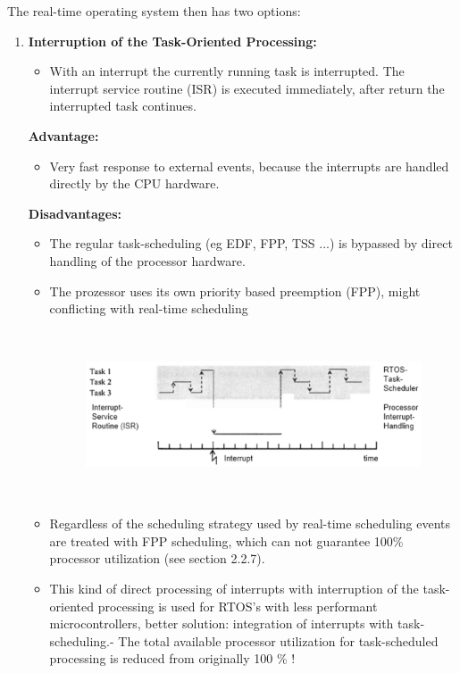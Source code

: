 The real-time operating system then has two options:
\newpage
\begin{enumerate}
\item {\rot\bf Interruption of the Task-Oriented Processing: }

\begin{itemize}
	\item With an interrupt the currently running task is interrupted. The interrupt service routine (ISR) is executed immediately, after return the interrupted task continues.
\end{itemize}

\textbf{Advantage: } 

\begin{itemize}
	\item Very fast response to external events, because the interrupts are handled directly   by the CPU hardware.
\end{itemize} 

\textbf{Disadvantages: }

\begin{itemize}

\item The regular task-scheduling (eg EDF, FPP, TSS ...) is bypassed by direct handling   of the processor hardware.

\item The prozessor uses its own priority based preemption (FPP), might conflicting with real-time scheduling

 	\begin{figure}[h]
    \centering
    \includegraphics[width=14cm, height=5cm]{Images/image22.png}
    \label{fig:Fig }
    \end{figure}

\item Regardless of the scheduling strategy used by real-time scheduling events are treated with FPP scheduling, which can not guarantee 100\% processor utilization   (see section 2.2.7).

\item This kind of direct processing of interrupts with interruption of the task-oriented   processing is used for RTOS's with less performant microcontrollers,   better solution: integration of interrupts with task-scheduling.- The total available processor utilization for task-scheduled processing is reduced from originally 100 \% !
\end{itemize}


\end{enumerate}

